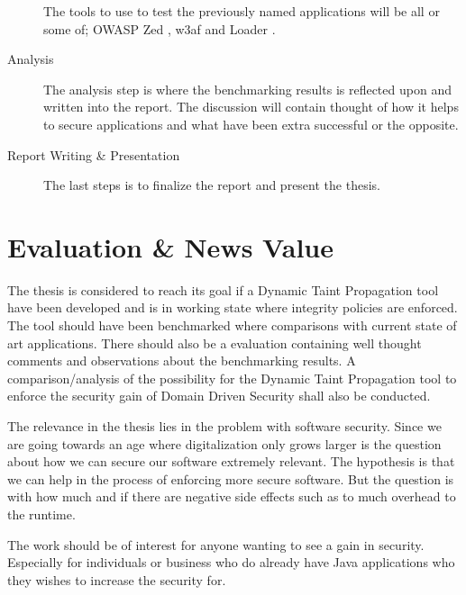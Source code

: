 \documentclass{../kththesis}
\begin{document}
\begin{description}
	The tools to use to test the previously named applications will be all or some of; OWASP Zed \parencite{zed}, w3af \parencite{w3af} and Loader \parencite{loader}.

	\item [Analysis]
	The analysis step is where the benchmarking results is reflected upon and written into the report. The discussion will contain thought of how it helps to secure applications and what have been extra successful or the opposite.

	\item [Report Writing \& Presentation]
	The last steps is to finalize the report and present the thesis.
\end{description}



\chapter{Evaluation \& News Value}
The thesis is considered to reach its goal if a Dynamic Taint Propagation tool have been developed and is in working state where integrity policies are enforced. The tool should have been benchmarked where comparisons with current state of art applications. There should also be a evaluation containing well thought comments and observations about the benchmarking results. A comparison/analysis of the possibility for the Dynamic Taint Propagation tool to enforce the security gain of Domain Driven Security shall also be conducted. 

The relevance in the thesis lies in the problem with software security. Since we are going towards an age where digitalization only grows larger is the question about how we can secure our software extremely relevant. The hypothesis is that we can help in the process of enforcing more secure software. But the question is with how much and if there are negative side effects such as to much overhead to the runtime.

The work should be of interest for anyone wanting to see a gain in security. Especially for individuals or business who do already have Java applications who they wishes to increase the security for.
\end{document}
